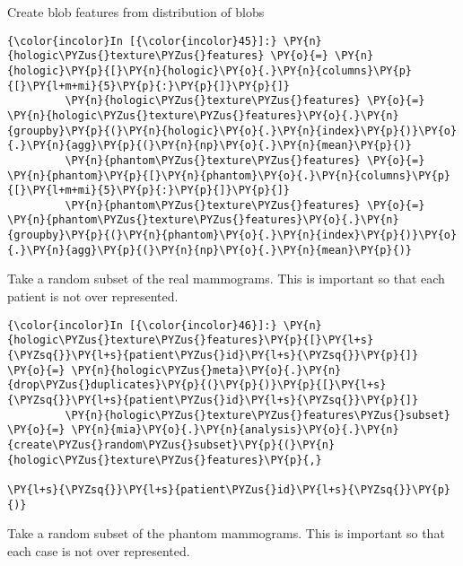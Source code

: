     Create blob features from distribution of blobs

    \begin{Verbatim}[commandchars=\\\{\}]
{\color{incolor}In [{\color{incolor}45}]:} \PY{n}{hologic\PYZus{}texture\PYZus{}features} \PY{o}{=} \PY{n}{hologic}\PY{p}{[}\PY{n}{hologic}\PY{o}{.}\PY{n}{columns}\PY{p}{[}\PY{l+m+mi}{5}\PY{p}{:}\PY{p}{]}\PY{p}{]}
         \PY{n}{hologic\PYZus{}texture\PYZus{}features} \PY{o}{=} \PY{n}{hologic\PYZus{}texture\PYZus{}features}\PY{o}{.}\PY{n}{groupby}\PY{p}{(}\PY{n}{hologic}\PY{o}{.}\PY{n}{index}\PY{p}{)}\PY{o}{.}\PY{n}{agg}\PY{p}{(}\PY{n}{np}\PY{o}{.}\PY{n}{mean}\PY{p}{)}
         \PY{n}{phantom\PYZus{}texture\PYZus{}features} \PY{o}{=} \PY{n}{phantom}\PY{p}{[}\PY{n}{phantom}\PY{o}{.}\PY{n}{columns}\PY{p}{[}\PY{l+m+mi}{5}\PY{p}{:}\PY{p}{]}\PY{p}{]}
         \PY{n}{phantom\PYZus{}texture\PYZus{}features} \PY{o}{=} \PY{n}{phantom\PYZus{}texture\PYZus{}features}\PY{o}{.}\PY{n}{groupby}\PY{p}{(}\PY{n}{phantom}\PY{o}{.}\PY{n}{index}\PY{p}{)}\PY{o}{.}\PY{n}{agg}\PY{p}{(}\PY{n}{np}\PY{o}{.}\PY{n}{mean}\PY{p}{)}
\end{Verbatim}

    Take a random subset of the real mammograms. This is important so that
each patient is not over represented.

    \begin{Verbatim}[commandchars=\\\{\}]
{\color{incolor}In [{\color{incolor}46}]:} \PY{n}{hologic\PYZus{}texture\PYZus{}features}\PY{p}{[}\PY{l+s}{\PYZsq{}}\PY{l+s}{patient\PYZus{}id}\PY{l+s}{\PYZsq{}}\PY{p}{]} \PY{o}{=} \PY{n}{hologic\PYZus{}meta}\PY{o}{.}\PY{n}{drop\PYZus{}duplicates}\PY{p}{(}\PY{p}{)}\PY{p}{[}\PY{l+s}{\PYZsq{}}\PY{l+s}{patient\PYZus{}id}\PY{l+s}{\PYZsq{}}\PY{p}{]}
         \PY{n}{hologic\PYZus{}texture\PYZus{}features\PYZus{}subset} \PY{o}{=} \PY{n}{mia}\PY{o}{.}\PY{n}{analysis}\PY{o}{.}\PY{n}{create\PYZus{}random\PYZus{}subset}\PY{p}{(}\PY{n}{hologic\PYZus{}texture\PYZus{}features}\PY{p}{,}
                                                                             \PY{l+s}{\PYZsq{}}\PY{l+s}{patient\PYZus{}id}\PY{l+s}{\PYZsq{}}\PY{p}{)}
\end{Verbatim}

    Take a random subset of the phantom mammograms. This is important so
that each case is not over represented.

